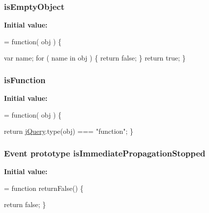 \subsubsection[{is\+Empty\+Object}]{ is\+Empty\+Object}\label{jquery-1_810_82-vsdoc_8js_aaf2bcef7602f40b9d2e1d70f197e44d1}
{\bfseries Initial value\+:}
\begin{DoxyCode}
= \textcolor{keyword}{function}( obj ) \{


        var name;
        \textcolor{keywordflow}{for} ( name in obj ) \{
            \textcolor{keywordflow}{return} \textcolor{keyword}{false};
        \}
        \textcolor{keywordflow}{return} \textcolor{keyword}{true};
    \}
\end{DoxyCode}
\hypertarget{jquery-1_810_82-vsdoc_8js_a02aa8413df0c687cbb1cd77943741d5a}{}
\subsubsection[{is\+Function}]{ is\+Function}\label{jquery-1_810_82-vsdoc_8js_a02aa8413df0c687cbb1cd77943741d5a}
{\bfseries Initial value\+:}
\begin{DoxyCode}
= \textcolor{keyword}{function}( obj ) \{


        \textcolor{keywordflow}{return} \hyperlink{jquery-1_810_82-vsdoc_8js_add5237586d970a38a81f990e8eb28c6c}{jQuery}.type(obj) === \textcolor{stringliteral}{"function"};
    \}
\end{DoxyCode}
\hypertarget{jquery-1_810_82-vsdoc_8js_a5fe8157d3a55c7b444e8d97b9dcde6a8}{}
\subsubsection[{is\+Immediate\+Propagation\+Stopped}]{ {\bf Event} {\bf prototype} is\+Immediate\+Propagation\+Stopped}\label{jquery-1_810_82-vsdoc_8js_a5fe8157d3a55c7b444e8d97b9dcde6a8}
{\bfseries Initial value\+:}
\begin{DoxyCode}
= \textcolor{keyword}{function} returnFalse() \{


    \textcolor{keywordflow}{return} \textcolor{keyword}{false};
\}
\end{DoxyCode}
\hypertarget{jquery-1_810_82-vsdoc_8js_aea21b7a3297c40d5d8862345d324796b}{}
